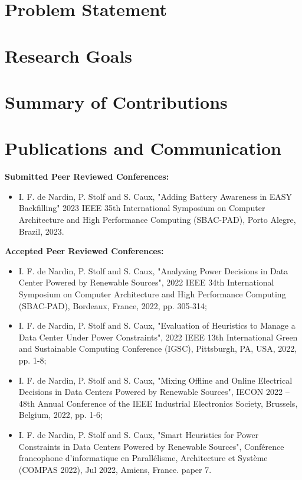 \section{Problem Statement}


\section{Research Goals}

\section{Summary of Contributions}

\section{Publications and Communication}

\textbf{Submitted Peer Reviewed Conferences:}
\begin{itemize}
    \item I. F. de Nardin, P. Stolf and S. Caux, "Adding Battery Awareness in EASY Backfilling" 2023 IEEE 35th International Symposium on Computer Architecture and High Performance Computing (SBAC-PAD), Porto Alegre, Brazil, 2023.
\end{itemize}

\textbf{Accepted Peer Reviewed Conferences:}
\begin{itemize}
    \item I. F. de Nardin, P. Stolf and S. Caux, "Analyzing Power Decisions in Data Center Powered by Renewable Sources", 2022 IEEE 34th International Symposium on Computer Architecture and High Performance Computing (SBAC-PAD), Bordeaux, France, 2022, pp. 305-314;
    \item I. F. de Nardin, P. Stolf and S. Caux, "Evaluation of Heuristics to Manage a Data Center Under Power Constraints", 2022 IEEE 13th International Green and Sustainable Computing Conference (IGSC), Pittsburgh, PA, USA, 2022, pp. 1-8;
    \item I. F. de Nardin, P. Stolf and S. Caux, "Mixing Offline and Online Electrical Decisions in Data Centers Powered by Renewable Sources", IECON 2022 – 48th Annual Conference of the IEEE Industrial Electronics Society, Brussels, Belgium, 2022, pp. 1-6;
    \item  I. F. de Nardin, P. Stolf and S. Caux, "Smart Heuristics for Power Constraints in Data Centers Powered by Renewable Sources", Conférence francophone d'informatique en Parallélisme, Architecture et Système (COMPAS 2022), Jul 2022, Amiens, France. paper 7.
\end{itemize}

